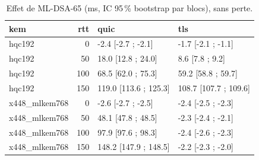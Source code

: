 \begin{table}
\caption{Effet de ML-DSA-65 (ms, IC 95\,\% bootstrap par blocs), sans perte.}
\label{tab:effet-rtt}
\begin{tabular}{lrll}
\toprule
kem & rtt & quic & tls \\
\midrule
hqc192 & 0 & -2.4 [-2.7 ; -2.1] & -1.7 [-2.1 ; -1.1] \\
hqc192 & 50 & 18.0 [12.8 ; 24.0] & 8.6 [7.8 ; 9.2] \\
hqc192 & 100 & 68.5 [62.0 ; 75.3] & 59.2 [58.8 ; 59.7] \\
hqc192 & 150 & 119.0 [113.6 ; 125.3] & 108.7 [107.7 ; 109.6] \\
x448\_mlkem768 & 0 & -2.6 [-2.7 ; -2.5] & -2.4 [-2.5 ; -2.3] \\
x448\_mlkem768 & 50 & 48.1 [47.8 ; 48.5] & -2.3 [-2.4 ; -2.1] \\
x448\_mlkem768 & 100 & 97.9 [97.6 ; 98.3] & -2.4 [-2.6 ; -2.3] \\
x448\_mlkem768 & 150 & 148.2 [147.9 ; 148.5] & -2.2 [-2.3 ; -2.0] \\
\bottomrule
\end{tabular}
\end{table}
